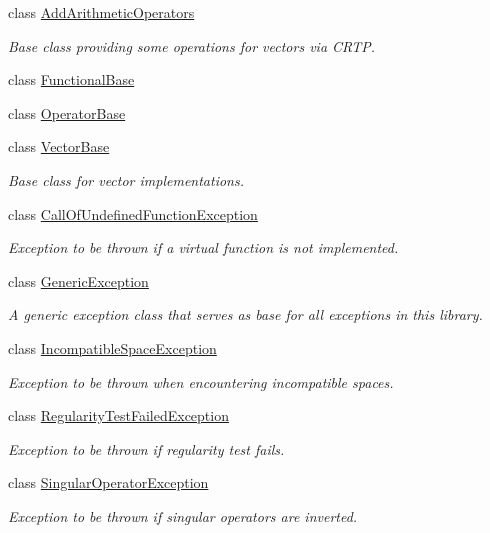 \begin{DoxyCompactItemize}
class \hyperlink{classSpacy_1_1AddArithmeticOperators}{\-Add\-Arithmetic\-Operators}
\begin{DoxyCompactList}\small\item\em \-Base class providing some operations for vectors via \-C\-R\-T\-P. \end{DoxyCompactList}\item 
class \hyperlink{classSpacy_1_1FunctionalBase}{\-Functional\-Base}
\item 
class \hyperlink{classSpacy_1_1OperatorBase}{\-Operator\-Base}
\item 
class \hyperlink{classSpacy_1_1VectorBase}{\-Vector\-Base}
\begin{DoxyCompactList}\small\item\em \-Base class for vector implementations. \end{DoxyCompactList}\item 
class \hyperlink{classSpacy_1_1CallOfUndefinedFunctionException}{\-Call\-Of\-Undefined\-Function\-Exception}
\begin{DoxyCompactList}\small\item\em \-Exception to be thrown if a virtual function is not implemented. \end{DoxyCompactList}\item 
class \hyperlink{classSpacy_1_1GenericException}{\-Generic\-Exception}
\begin{DoxyCompactList}\small\item\em \-A generic exception class that serves as base for all exceptions in this library. \end{DoxyCompactList}\item 
class \hyperlink{classSpacy_1_1IncompatibleSpaceException}{\-Incompatible\-Space\-Exception}
\begin{DoxyCompactList}\small\item\em \-Exception to be thrown when encountering incompatible spaces. \end{DoxyCompactList}\item 
class \hyperlink{classSpacy_1_1RegularityTestFailedException}{\-Regularity\-Test\-Failed\-Exception}
\begin{DoxyCompactList}\small\item\em \-Exception to be thrown if regularity test fails. \end{DoxyCompactList}\item 
class \hyperlink{classSpacy_1_1SingularOperatorException}{\-Singular\-Operator\-Exception}
\begin{DoxyCompactList}\small\item\em \-Exception to be thrown if singular operators are inverted. \end{DoxyCompactList}\item 

\end{DoxyCompactItemize}
